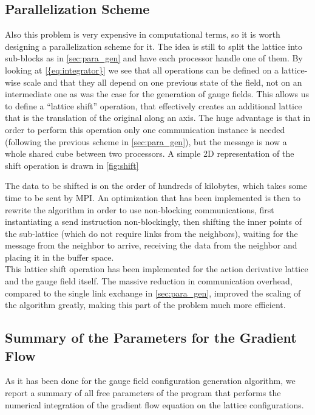 \subsection{Parallelization Scheme}
Also this problem is very expensive in computational terms, so it is worth designing a parallelization scheme for it. The idea is still to split the lattice into sub-blocks as in \cref{sec:para_gen} and have each processor handle one of them.
By looking at \cref{{eq:integrator}} we see that all operations can be defined on a lattice-wise scale and that they all depend on one previous state of the field, not on an intermediate one as was the case for the generation of gauge fields. This allows us to define a ``lattice shift'' operation, that effectively creates an additional lattice that is the translation of the original along an axis. The huge advantage is that in order to perform this operation only one communication instance is needed (following the previous scheme in \cref{sec:para_gen}), but the message is now a whole shared cube between two processors. A simple 2D representation of the shift operation is drawn in \cref{fig:shift}


The data to be shifted is on the order of hundreds of kilobytes, which takes some time to be sent by MPI. An optimization that has been implemented is then to rewrite the algorithm in order to use non-blocking communications, first instantiating a send instruction non-blockingly, then shifting the inner points of the sub-lattice (which do not require links from the neighbors), waiting for the message from the neighbor to arrive, receiving the data from the neighbor and placing it in the buffer space.\\
This lattice shift operation has been implemented for the action derivative lattice and the gauge field itself. The massive reduction in communication overhead, compared to the single link exchange in \cref{sec:para_gen}, improved the scaling of the algorithm greatly, making this part of the problem much more efficient.

\subsection{Summary of the Parameters for the Gradient Flow}
As it has been done for the gauge field configuration generation algorithm, we report a summary of all free parameters of the program that performs the numerical integration of the gradient flow equation on the lattice configurations.

